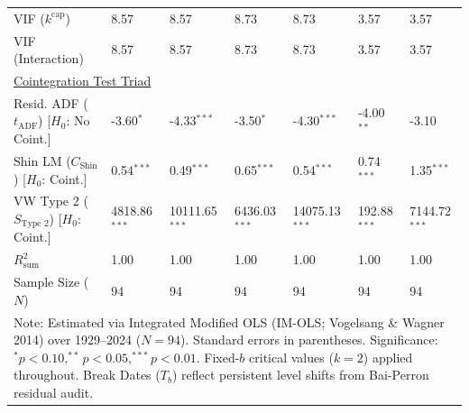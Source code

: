 \begin{table}[H]
\begin{tabular}{p{3.8cm}p{1.35cm}p{1.35cm}p{1.35cm}p{1.35cm}p{1.35cm}p{1.35cm}}
VIF ($k^{\text{cap}}$) & 8.57 & 8.57 & 8.73 & 8.73 & 3.57 & 3.57  \\
VIF (Interaction) & 8.57 & 8.57 & 8.73 & 8.73 & 3.57 & 3.57  \\
\midrule
\multicolumn{7}{l}{\underline{Cointegration Test Triad}} \\
\makecell[l]{Resid. ADF ($t_{\text{ADF}}$) \\ {\scriptsize [$H_0$: No Coint.]}} & -3.60$^{*}$ & -4.33$^{***}$ & -3.50$^{*}$ & -4.30$^{***}$ & -4.00$^{**}$ & -3.10  \\
\makecell[l]{Shin LM ($C_{\text{Shin}}$) \\ {\scriptsize [$H_0$: Coint.]}} & 0.54$^{***}$ & 0.49$^{***}$ & 0.65$^{***}$ & 0.54$^{***}$ & 0.74$^{***}$ & 1.35$^{***}$  \\
\makecell[l]{VW Type 2 ($S_{\text{Type 2}}$) \\ {\scriptsize [$H_0$: Coint.]}} & 4818.86$^{***}$ & 10111.65$^{***}$ & 6436.03$^{***}$ & 14075.13$^{***}$ & 192.88$^{***}$ & 7144.72$^{***}$  \\
\midrule
$R^2_{\text{sum}}$ & 1.00 & 1.00 & 1.00 & 1.00 & 1.00 & 1.00  \\
Sample Size ($N$) & 94 & 94 & 94 & 94 & 94 & 94  \\
\bottomrule
\multicolumn{7}{p{13.2cm}}{\footnotesize Note: Estimated via Integrated Modified OLS (IM-OLS; Vogelsang \& Wagner 2014) over 1929--2024 ($N=94$). Standard errors in parentheses. Significance: $^*p<0.10, ^{**}p<0.05, ^{***}p<0.01$. Fixed-$b$ critical values ($k=2$) applied throughout. Break Dates ($T_b$) reflect persistent level shifts from Bai-Perron residual audit.}
\end{tabular}
\end{table}
